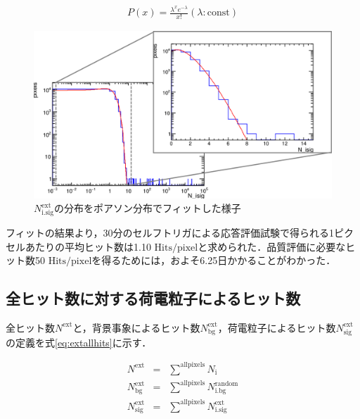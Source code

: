 \begin{eqnarray}
  \label{eq:poisson}
  P(x) = \frac{\lambda^x e^{-\lambda}}{x!} (\lambda:\mathrm{const})
\end{eqnarray}

\begin{figure}[h]
  \centering
  \includegraphics[width=15cm]{./figure/extfit.png}
  \caption{$N_{\mathrm{i.sig}}^{\mathrm{ext}}$の分布をポアソン分布でフィットした様子}
  \label{fig:exthitfreq}
\end{figure}

フィットの結果より，30分のセルフトリガによる応答評価試験で得られる1ピクセルあたりの平均ヒット数は1.10 $\mathrm{Hits/pixel}$と求められた．品質評価に必要なヒット数50 $\mathrm{Hits/pixel}$を得るためには，およそ6.25日かかることがわかった．

\subsection*{全ヒット数に対する荷電粒子によるヒット数}
全ヒット数$N^{\mathrm{ext}}$と，背景事象によるヒット数$N_{\mathrm{bg}}^{\mathrm{ext}}$，荷電粒子によるヒット数$N_{\mathrm{sig}}^{\mathrm{ext}}$の定義を式\ref{eq:extallhits}に示す．

\begin{eqnarray}
  N^{\mathrm{ext}} &=& \sum^{\mathrm{allpixels}} N_{\mathrm{i}} \\
  N_{\mathrm{bg}}^{\mathrm{ext}} &=& \sum^{\mathrm{allpixels}} N_{\mathrm{i.bg}}^{\mathrm{random}} \\
  N_{\mathrm{sig}}^{\mathrm{ext}} &=& \sum^{\mathrm{allpixels}} N_{\mathrm{i.sig}}^{\mathrm{ext}}
\end{eqnarray}

